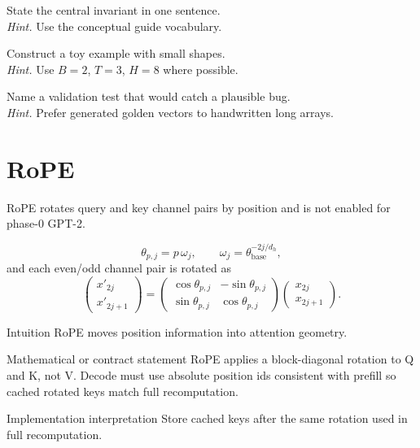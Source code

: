 \begin{chapterexercises}
\item State the central invariant in one sentence.\\
\textit{Hint.} Use the conceptual guide vocabulary.
\item Construct a toy example with small shapes.\\
\textit{Hint.} Use $B=2$, $T=3$, $H=8$ where possible.
\item Name a validation test that would catch a plausible bug.\\
\textit{Hint.} Prefer generated golden vectors to handwritten long arrays.
\end{chapterexercises}

\chapter{RoPE}
\label{ch:rope}
RoPE rotates query and key channel pairs by position and is not enabled for phase-0 GPT-2. \citep{su2021roformer}

\[
\theta_{p,j}=p\,\omega_j,\qquad \omega_j=\theta_{\mathrm{base}}^{-2j/d_h},
\]
and each even/odd channel pair is rotated as
\[
\begin{pmatrix}x'_{2j}\\x'_{2j+1}\end{pmatrix}
=
\begin{pmatrix}\cos\theta_{p,j}&-\sin\theta_{p,j}\\
\sin\theta_{p,j}&\cos\theta_{p,j}\end{pmatrix}
\begin{pmatrix}x_{2j}\\x_{2j+1}\end{pmatrix}.
\]

\begin{intuitionbox}{Intuition}
RoPE moves position information into attention geometry.
\end{intuitionbox}

\begin{definitionbox}{Mathematical or contract statement}
RoPE applies a block-diagonal rotation to Q and K, not V. Decode must use absolute position ids consistent with prefill so cached rotated keys match full recomputation.
\end{definitionbox}

\begin{implementationbox}{Implementation interpretation}
Store cached keys after the same rotation used in full recomputation.
\end{implementationbox}

